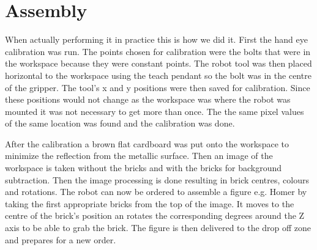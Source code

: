 \chapter{Assembly}


When actually performing it in practice this is how we did it. First the hand eye calibration was run. The points chosen for calibration were the bolts that were in the workspace because they were constant points. The robot tool was then placed horizontal to the workspace using the teach pendant so the bolt was in the centre of the gripper. The tool's x and y positions were then saved for calibration. Since these positions would not change as the workspace was where the robot was mounted it was not necessary to get more than once. The the same pixel values of the same location was found and the calibration was done.  

After the calibration a brown flat cardboard was put onto the workspace to minimize the reflection from the metallic surface. Then an image of the workspace is taken without the bricks and with the bricks for background subtraction. Then the image processing is done resulting in brick centres, colours and rotations. The robot can now be ordered to assemble a figure e.g. Homer by taking the first appropriate bricks from the top of the image. It moves to the centre of the brick's position an rotates the corresponding degrees around the Z axis to be able to grab the brick.  The figure is then delivered to the drop off zone and prepares for a new order. 